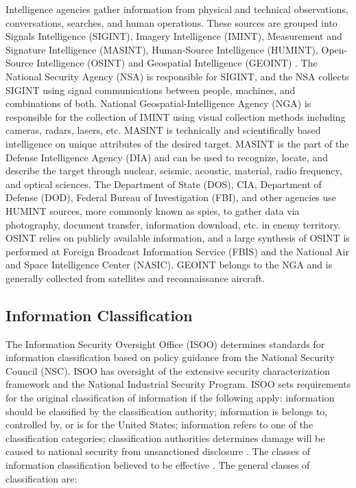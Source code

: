 \documentclass{report}
\begin{document}
Intelligence agencies gather information from physical and technical observations, conversations, searches, and human operations. These sources are grouped into Signals Intelligence (SIGINT), Imagery Intelligence (IMINT), Measurement and Signature Intelligence (MASINT), Human-Source Intelligence (HUMINT), Open-Source Intelligence (OSINT) and Geospatial Intelligence (GEOINT) \cite{Intelligen}. The National Security Agency (NSA) is responsible for SIGINT, and the NSA collects SIGINT using signal communications between people, machines, and combinations of both. National Geospatial-Intelligence Agency (NGA) is responsible for the collection of IMINT using visual collection methods including cameras, radars, lasers, etc. MASINT is technically and scientifically based intelligence on unique attributes of the desired target. MASINT is the part of the Defense Intelligence Agency (DIA) and can be used to recognize, locate, and describe the target through nuclear, seismic, acoustic, material, radio frequency, and optical sciences. The Department of State (DOS), CIA, Department of Defense (DOD), Federal Bureau of Investigation (FBI), and other agencies use HUMINT sources, more commonly known as spies, to gather data via photography, document transfer, information download, etc. in enemy territory. OSINT relies on publicly available information, and a large synthesis of OSINT is performed at Foreign Broadcast Information Service (FBIS) and the National Air and Space Intelligence Center (NASIC). GEOINT belongs to the NGA and is generally collected from satellites and reconnaissance aircraft. 

\subsection{Information Classification}

The Information Security Oversight Office (ISOO) determines standards for information classification based on policy guidance from the National Security Council (NSC). ISOO has oversight of the extensive security characterization framework and the National Industrial Security Program. ISOO sets requirements for the original classification of information if the following apply: information should be classified by the classification authority; information is belongs to, controlled by, or is for the United States; information refers to one of the classification categories; classification authorities determines damage will be caused to national security from unsanctioned disclosure \cite{Office2010}. The classes of information classification believed to be effective \cite{Richelson2011,Office2010}.  The general classes of classification are:
\end{document}
